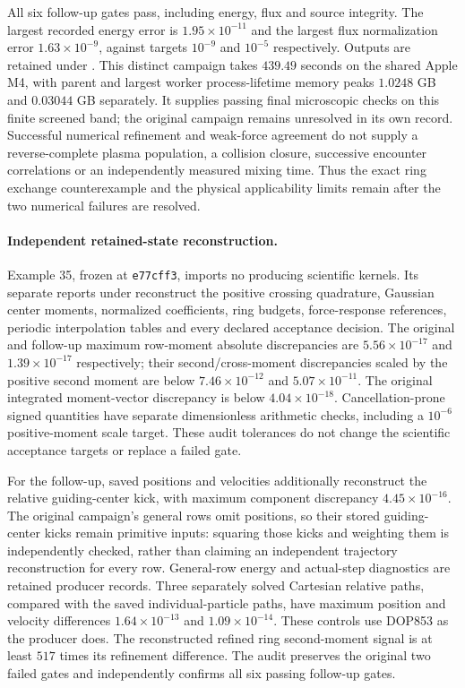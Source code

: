 \documentclass[11pt,letterpaper]{article}
\begin{document}
All six follow-up gates pass, including energy, flux and source integrity.
The largest recorded energy error is $1.95\times10^{-11}$ and the
largest flux normalization error $1.63\times10^{-9}$, against targets
$10^{-9}$ and $10^{-5}$ respectively. Outputs are retained under
. This distinct campaign takes
$439.49$ seconds on the shared Apple M4, with parent and largest worker
process-lifetime memory peaks $1.0248$ GB and $0.03044$ GB separately.
It supplies passing final microscopic checks on this finite screened
band; the original campaign remains unresolved in its own record.
Successful numerical refinement and weak-force agreement do not supply
a reverse-complete plasma population, a collision closure, successive
encounter correlations or an independently measured mixing time. Thus
the exact ring exchange counterexample and the physical applicability
limits remain after the two numerical failures are resolved.

\paragraph{Independent retained-state reconstruction.}
Example 35, frozen at \texttt{e77cff3}, imports no producing scientific
kernels. Its separate reports under 
reconstruct the positive crossing quadrature, Gaussian center moments,
normalized coefficients, ring budgets, force-response references,
periodic interpolation tables and every declared acceptance decision.
The original and follow-up maximum row-moment absolute discrepancies
are $5.56\times10^{-17}$ and $1.39\times10^{-17}$ respectively;
their second/cross-moment discrepancies scaled by the positive second
moment are below $7.46\times10^{-12}$ and $5.07\times10^{-11}$.
The original integrated moment-vector discrepancy is below
$4.04\times10^{-18}$. Cancellation-prone signed quantities have separate
dimensionless arithmetic checks, including a $10^{-6}$ positive-moment
scale target. These audit tolerances do not change the scientific
acceptance targets or replace a failed gate.

For the follow-up, saved positions and velocities additionally reconstruct
the relative guiding-center kick, with maximum component discrepancy
$4.45\times10^{-16}$. The original campaign's general rows omit positions,
so their stored guiding-center kicks remain primitive inputs: squaring
those kicks and weighting them is independently checked, rather than
claiming an independent trajectory reconstruction for every row.
General-row energy and actual-step diagnostics are retained producer
records. Three separately solved Cartesian relative paths, compared
with the saved individual-particle paths, have maximum position and
velocity differences $1.64\times10^{-13}$ and $1.09\times10^{-14}$.
These controls use DOP853 as the producer does. The reconstructed refined
ring second-moment signal is at least $517$ times its refinement
difference. The audit preserves the original two failed gates and
independently confirms all six passing follow-up gates.
\end{document}
